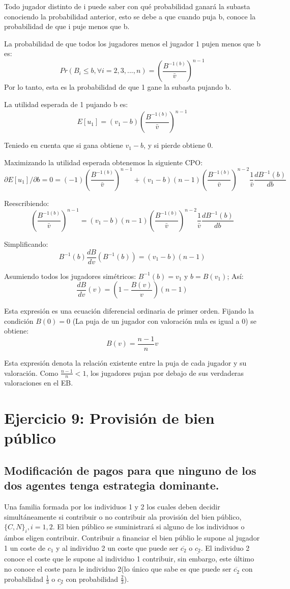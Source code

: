 \documentclass{article}
\begin{document}
Todo jugador distinto de i puede saber con qu\'e probabilidad ganar\'a la subasta conociendo la probabilidad anterior, esto se debe a que cuando puja b, conoce la probabilidad de que i puje menos que b.

La probabilidad de que todos los jugadores menos el jugador 1 pujen menos que b es:
$$Pr(B_i\leq b, \forall i=2,3,...,n)=(\frac{B^{-1(b)}}{\bar{v}})^{n-1}$$
 Por lo tanto, esta es la probabilidad de que 1 gane la subasta pujando b.

La utilidad esperada de 1 pujando b es:
$$E[u_1]=(v_1-b)(\frac{B^{-1(b)}}{\bar{v}})^{n-1}$$

Teniedo en cuenta que si gana obtiene $v_1-b$, y si pierde obtiene 0.

Maximizando la utilidad esperada obtenemos la siguiente CPO:
$$\partial E[u_1]/\partial b=0=(-1)(\frac{B^{-1(b)}}{\bar{v}})^{n-1}+(v_1-b)(n-1)(\frac{B^{-1(b)}}{\bar{v}})^{n-2}\frac{1}{\bar{v}}\frac{dB^{-1}(b)}{db}$$

Reescribiendo:
$$(\frac{B^{-1(b)}}{\bar{v}})^{n-1}=(v_1-b)(n-1)(\frac{B^{-1(b)}}{\bar{v}})^{n-2}\frac{1}{\bar{v}}\frac{dB^{-1}(b)}{db}$$

Simplificando:
$$B^{-1}(b)\frac{dB}{dv}(B^{-1}(b))=(v_1-b)(n-1)$$

Asumiendo todos los jugadores sim\'etricos: $B^{-1}(b)=v_1$ y $b=B(v_1)$; As\'i:
$$\frac{dB}{dv}(v)=(1-\frac{B(v)}{v})(n-1)$$

Esta expresi\'on es una ecuaci\'on diferencial ordinaria de primer orden. Fijando la condici\'on $B(0)=0$ (La puja de un jugador con valoraci\'on nula es igual a 0) se obtiene:
$$B(v)=\frac{n-1}{n}v$$

Esta expresi\'on denota la relaci\'on existente entre la puja de cada jugador y su valoraci\'on. Como $\frac{n-1}{n}<1$, los jugadores pujan por debajo de sus verdaderas valoraciones en el EB.



\section{Ejercicio 9: Provisi\'on de bien p\'ublico}
\subsection{Modificaci\'on de pagos para que ninguno de los dos agentes tenga estrategia dominante.}

Una familia formada por los individuos 1 y 2 los cuales deben decidir simult\'aneamente si contribuir o no contribuir ala provisi\'on del bien p\'ublico, $\{C,N\}_i, i=1,2$. El bien p\'ublico se suministrar\'a si alguno de los individuos o \'ambos eligen contribuir. Contribuir a financiar el bien p\'ublio le supone al jugador 1 un coste de $c_1$ y al individuo 2 un coste que puede ser $\overline{c_2}$ o $\underline{c_2}$. El individuo 2 conoce el coste que le supone al individuo 1 contribuir, sin embargo, este \'ultimo no conoce el coste para le individuo 2(lo único que sabe es que puede ser $\overline{c_2}$ con probabilidad $\frac{1}{3}$ o $\underline{c_2}$ con probabilidad $\frac{2}{3}$).
\end{document}
